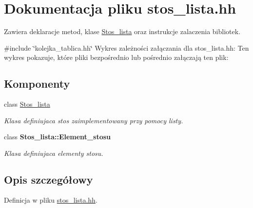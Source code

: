 \hypertarget{stos__lista_8hh}{\section{\-Dokumentacja pliku stos\-\_\-lista.\-hh}
\label{stos__lista_8hh}
}


\-Zawiera deklaracje metod, klase \hyperlink{class_stos__lista}{\-Stos\-\_\-lista} oraz instrukcje zalaczenia bibliotek.  


{\ttfamily \#include \char`\"{}kolejka\-\_\-tablica.\-hh\char`\"{}}\*
\-Wykres zależności załączania dla stos\-\_\-lista.\-hh\-:
\-Ten wykres pokazuje, które pliki bezpośrednio lub pośrednio załączają ten plik\-:
\subsection*{\-Komponenty}
\begin{DoxyCompactItemize}
\item 
class \hyperlink{class_stos__lista}{\-Stos\-\_\-lista}
\begin{DoxyCompactList}\small\item\em \-Klasa definiujaca stos zaimplementowany przy pomocy listy. \end{DoxyCompactList}\item 
class {\bfseries \-Stos\-\_\-lista\-::\-Element\-\_\-stosu}
\begin{DoxyCompactList}\small\item\em \-Klasa definiujaca elementy stosu. \end{DoxyCompactList}\end{DoxyCompactItemize}


\subsection{\-Opis szczegółowy}


\-Definicja w pliku \hyperlink{stos__lista_8hh_source}{stos\-\_\-lista.\-hh}.

